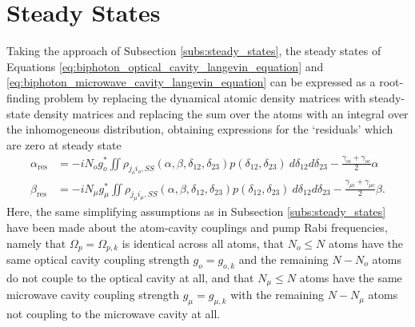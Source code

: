 \section{Steady States}
Taking the approach of Subsection \ref{subs:steady_states}, the steady states of Equations \ref{eq:biphoton_optical_cavity_langevin_equation} and \ref{eq:biphoton_microwave_cavity_langevin_equation} can be expressed as a root-finding problem by replacing the dynamical atomic density matrices with steady-state density matrices and replacing the sum over the atoms with an integral over the inhomogeneous distribution, obtaining expressions for the `residuals' which are zero at steady state
\begin{align}
    \alpha_\text{res} &= -iN_og_o^* \iint \rho_{j_oi_o,SS}(\alpha, \beta, \delta_{12}, \delta_{23}) p(\delta_{12}, \delta_{23})\:d\delta_{12}d\delta_{23} - \frac{\gamma_{oi}+\gamma_{oc}}{2}\alpha \label{eq:biphoton_optical_cavity_steady_state_residual}\\
    \beta_\text{res} &= -iN_\mu g_\mu^* \iint \rho_{j_\mu i_\mu,SS}(\alpha, \beta, \delta_{12}, \delta_{23}) p(\delta_{12}, \delta_{23})\:d\delta_{12}d\delta_{23} - \frac{\gamma_{\mu i}+\gamma_{\mu c}}{2}\beta. \label{eq:biphoton_microwave_cavity_steady_state_residual}
\end{align}
Here, the same simplifying assumptions as in Subsection \ref{subs:steady_states} have been made about the atom-cavity couplings and pump Rabi frequencies, namely that $\Omega_p = \Omega_{p,k}$ is identical across all atoms, that $N_o \leq N$ atoms have the same optical cavity coupling strength $g_o = g_{o,k}$ and the remaining $N-N_o$ atoms do not couple to the optical cavity at all, and that $N_\mu \leq N$ atoms have the same microwave cavity coupling strength $g_\mu = g_{\mu,k}$ with the remaining $N-N_\mu$ atoms not coupling to the microwave cavity at all.

